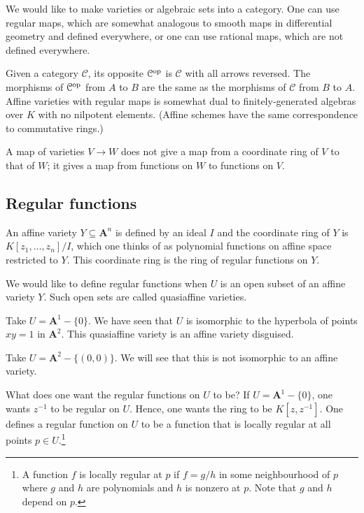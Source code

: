 \documentclass [11 pt, oneside] {article}
\begin{document}
We would like to make varieties or algebraic sets into a category. One can use regular maps, which are somewhat analogous to smooth maps in differential geometry and defined everywhere, or one can use rational maps, which are not defined everywhere.

Given a category $\mathcal{C} $, its opposite $\mathcal{C}\textsuperscript{op}$ is $\mathcal{C} $ with all arrows reversed. The morphisms of ${\mathcal{C}}\textsuperscript{op} $ from $A$ to $B$ are the same as the morphisms of $\mathcal{C} $ from $B$ to $A$. Affine varieties with regular maps is somewhat dual to finitely-generated algebras over $K$ with no nilpotent elements. (Affine schemes have the same correspondence to commutative rings.)

A map of varieties $V\longrightarrow W$ does not give a map from a coordinate ring of $V$ to that of $W$; it gives a map from functions on $W$ to functions on $V$.


\subsection{Regular functions}
An affine variety $Y\subseteq \mathbf{A}^n$ is defined by an ideal $I$ and the coordinate ring of $Y$ is $K[z_1,\hdots,z_n]/I$, which one thinks of as polynomial functions on affine space restricted to $Y$. This coordinate ring is the ring of regular functions on $Y$.

We would like to define regular functions when $U$ is an open subset of an affine variety $Y$. Such open sets are called quasiaffine varieties.

\begin{example}\label{}
Take $U=\mathbf{A}^1-\{0\}$. We have seen that $U$ is isomorphic to the hyperbola of points $xy=1$ in $\mathbf{A}^2$. This quasiaffine variety is an affine variety disguised.

Take $U=\mathbf{A}^2-\{(0,0)\}$. We will see that this is not isomorphic to an affine variety.
\end{example}

What does one want the regular functions on $U$ to be? If $U=\mathbf{A}^1-\{0\}$, one wants $z^{-1}$ to be regular on $U$. Hence, one wants the ring to be $K[z,z^{-1}]$. One defines a regular function on $U$ to be a function that is locally regular at all points $p\in U$.\footnote{A function $f$ is locally regular at $p$ if $f=g/h$ in some neighbourhood of $p$ where $g$ and $h$ are polynomials and $h$ is nonzero at $p$. Note that $g$ and $h$ depend on $p$.}
\end{document}
